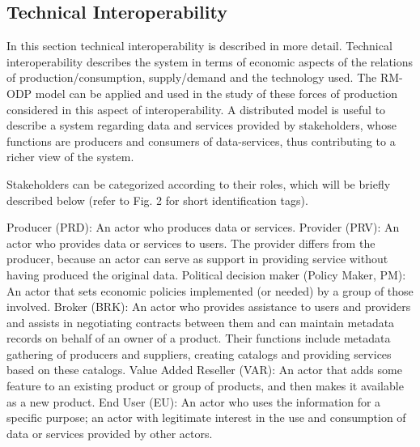 \documentclass[10pt,twocolumn,ieeetran]{article}
\begin{document}
\subsection{Technical Interoperability}
In this section technical interoperability is described in more detail. Technical interoperability describes the system in terms of economic aspects of the relations of production/consumption, supply/demand and the technology used. The RM-ODP model can be applied and used in the study of these forces of production considered in this aspect of interoperability. A distributed model is useful to describe a system regarding data and services provided by stakeholders, whose functions are producers and consumers of data-services, thus contributing to a richer view of the system.

Stakeholders can be categorized according to their roles, which will be briefly described below (refer to Fig. 2 for short identification tags).

Producer (PRD): An actor who produces data or services. Provider (PRV): An actor who provides data or services to users. The provider differs from the producer, because an actor can serve as support in providing service without having produced the original data. Political decision maker (Policy Maker, PM): An actor that sets economic policies implemented (or needed) by a group of those involved. Broker (BRK): An actor who provides assistance to users and providers and assists in negotiating contracts between them and can maintain metadata records on behalf of an owner of a product. Their functions include metadata gathering of producers and suppliers, creating catalogs and providing services based on these catalogs. Value Added Reseller (VAR): An actor that adds some feature to an existing product or group of products, and then makes it available as a new product. End User (EU): An actor who uses the information for a specific purpose; an actor with legitimate interest in the use and consumption of data or services provided by other actors.


\end{document}

